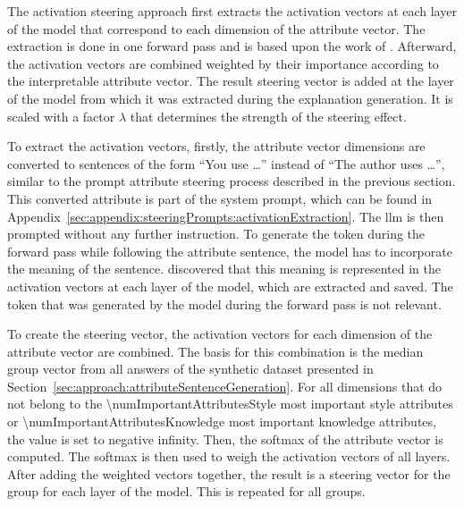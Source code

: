 The activation steering approach first extracts the activation vectors at each layer of the model that correspond to each dimension of the attribute vector. The extraction is done in one forward pass and is based upon the work of \citet{konenStyleVectorsSteering2024}. %
Afterward, the activation vectors are combined weighted by their importance according to the interpretable attribute vector. The result steering vector is added at the layer of the model from which it was extracted during the explanation generation. It is scaled with a factor \(\lambda\) that determines the strength of the steering effect.

To extract the activation vectors, firstly, the attribute vector dimensions are converted to sentences of the form \enquote{You use \ldots} instead of \enquote{The author uses \ldots}, similar to the prompt attribute steering process described in the previous section. This converted attribute is part of the system prompt, which can be found in Appendix~\ref{sec:appendix:steeringPrompts:activationExtraction}. The \ac{llm} is then prompted without any further instruction. To generate the token during the forward pass while following the attribute sentence, the model has to incorporate the meaning of the sentence. \citet{konenStyleVectorsSteering2024} discovered that this meaning is represented in the activation vectors at each layer of the model, which are extracted and saved. The token that was generated by the model during the forward pass is not relevant.

To create the steering vector, the activation vectors for each dimension of the attribute vector are combined. The basis for this combination is the median group vector from all answers of the synthetic dataset presented in Section~\ref{sec:approach:attributeSentenceGeneration}. For all dimensions that do not belong to the \num{\numImportantAttributesStyle} most important style attributes or \num{\numImportantAttributesKnowledge} most important knowledge attributes, the value is set to negative infinity. Then, the softmax of the attribute vector is computed. The softmax is then used to weigh the activation vectors of all layers. After adding the weighted vectors together, the result is a steering vector for the group for each layer of the model. This is repeated for all groups.
